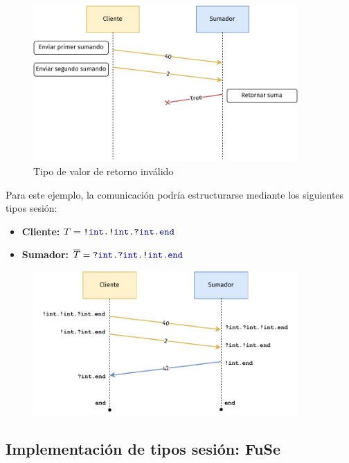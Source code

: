 \begin{frame}{\insertsubsection}
	\begin{figure}
		\centering
		\includegraphics[width=0.9\textwidth]{images/sum-diagram-type-violation.pdf}
		\caption{Tipo de valor de retorno inválido}
	\end{figure}
\end{frame}

\begin{frame}{\insertsubsection}
	Para este ejemplo, la comunicación podría estructurarse mediante los siguientes tipos sesión:
	\begin{itemize}
		\item \textbf{Cliente:} $\SessionType = \Out\tint{ \Out\tint{ \In\tint\End } }$
		\item \textbf{Sumador:} $\dual\SessionType = \In\tint{ \In\tint{ \Out\tint\End } }$
	\end{itemize}

	\begin{figure}
		\centering
		\includegraphics[width=0.9\textwidth]{images/sum-diagram-st.pdf}
	\end{figure}
\end{frame}

\subsection{Implementación de tipos sesión: FuSe}


